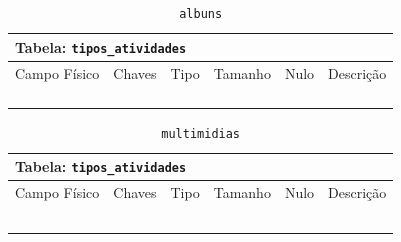 \documentclass[12pt,a4paper]{article}
\begin{document}
\begin{center}
\begin{table}[h!]
	\caption{\texttt{albuns}}
	\label{tabela:albuns}
	\begin{tabular}{|p{2.5cm}|p{1cm}|p{1.25cm}|p{1.75cm}|p{1.25cm}|p{5cm}|}\hline	
		\multicolumn{6}{|p{16cm}|}{\cellcolor{cinzaClaro}  \centering Tabela: \texttt{tipos\_atividades}} \\ \hline %
		{\small Campo Físico}   & {\small Chaves} & {\small Tipo} & {\small Tamanho} & {\small Nulo} & {\small Descrição}\\\hline %
		
		{\tiny } & {\tiny } & {\tiny } & {\tiny } & {\tiny } &{\tiny }\\\hline
		{\tiny } & {\tiny } & {\tiny } & {\tiny } & {\tiny } &{\tiny }\\\hline
		{\tiny } & {\tiny } & {\tiny } & {\tiny } & {\tiny } &{\tiny }\\\hline
		{\tiny } & {\tiny } & {\tiny } & {\tiny } & {\tiny } &{\tiny }\\\hline
			
	\end{tabular}
\end{table}	
\end{center}


\begin{center}
\begin{table}[h!]
	\caption{\texttt{multimidias}}
	\label{tabela:multimidias}
	\begin{tabular}{|p{2.5cm}|p{1cm}|p{1.25cm}|p{1.75cm}|p{1.25cm}|p{5cm}|}\hline	
		\multicolumn{6}{|p{16cm}|}{\cellcolor{cinzaClaro}  \centering Tabela: \texttt{tipos\_atividades}} \\ \hline %
		{\small Campo Físico}   & {\small Chaves} & {\small Tipo} & {\small Tamanho} & {\small Nulo} & {\small Descrição}\\\hline %
		
		{\tiny } & {\tiny } & {\tiny } & {\tiny } & {\tiny } &{\tiny }\\\hline
		{\tiny } & {\tiny } & {\tiny } & {\tiny } & {\tiny } &{\tiny }\\\hline
		{\tiny } & {\tiny } & {\tiny } & {\tiny } & {\tiny } &{\tiny }\\\hline
		{\tiny } & {\tiny } & {\tiny } & {\tiny } & {\tiny } &{\tiny }\\\hline
		{\tiny } & {\tiny } & {\tiny } & {\tiny } & {\tiny } &{\tiny }\\\hline
			
	\end{tabular}
\end{table}	
\end{center}
\end{document}
